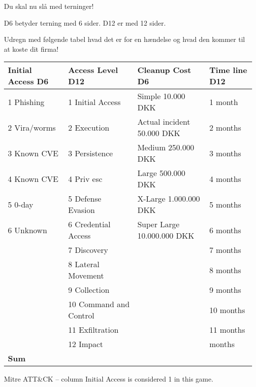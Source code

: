 \documentclass[a4paper,11pt,notitlepage,landscape]{report}
\begin{document}
Du skal nu slå med terninger!

D6 betyder terning med 6 sider. D12 er med 12 sider.

Udregn med følgende tabel hvad det er for en hændelse og hvad den kommer til at koste dit firma!

\begin{tabularx}{\textwidth-1cm}{|p{4cm}|X|p{7cm}|p{3cm}|} \hline
{\bf Initial Access D6} & {\bf Access Level D12} & {\bf Cleanup Cost D6} & {\bf Time line D12} \\\hline
1 Phishing   & 1 Initial Access & Simple 10.000 DKK & 1 month\\\hline
2 Vira/worms & 2 Execution & Actual incident 50.000 DKK &2 months\\\hline
3 Known CVE  & 3 Persistence & Medium 250.000 DKK & 3 months\\\hline
4 Known CVE  & 4 Priv esc & Large 500.000 DKK &4 months\\\hline
5 0-day      & 5 Defense Evasion & X-Large 1.000.000 DKK & 5 months\\\hline
6 Unknown    & 6 Credential Access & Super Large 10.000.000 DKK & 6 months\\\hline
             & 7 Discovery & & 7 months \\\hline
             & 8 Lateral Movement & & 8 months \\\hline
             & 9 Collection & & 9 months \\\hline
             & 10 Command and Control & & 10 months\\\hline
             & 11 Exfiltration & & 11 months\\\hline
             & 12 Impact & & months \\\hline
{\bf Sum} & & \\\hline
\end{tabularx}

Mitre ATT\&CK  -- column Initial Access is considered 1 in this game.
\end{document}
